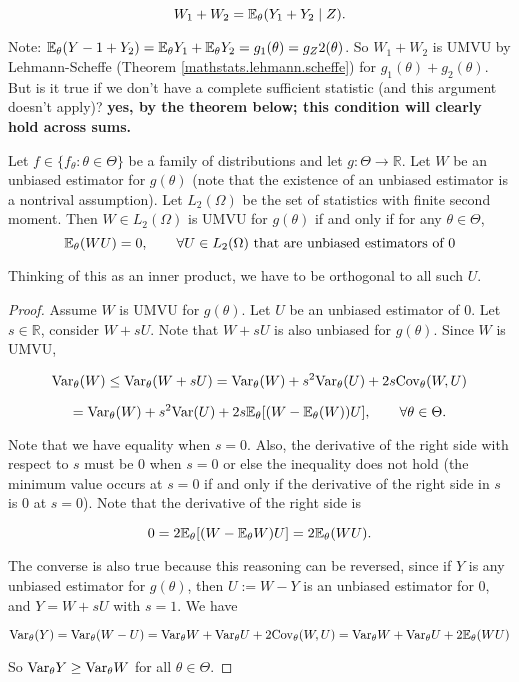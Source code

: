\[
W_1 + W_2 = \E_\theta(Y_1 + Y_2 \mid Z).
\]

Note: \(\E_\theta(Y-1 + Y_2) = \E_\theta Y_1 + \E_\theta Y_2 = g_1(\theta) = g_Z2(\theta)\). So \(W_1 + W_2\) is UMVU by Lehmann-Scheffe (Theorem \ref{mathstats.lehmann.scheffe}) for \(g_1(\theta) + g_2(\theta)\). But is it true if we don't have a complete sufficient statistic (and this argument doesn't apply)? \textbf{yes, by the theorem below; this condition will clearly hold across sums.}

\begin{theorem} Let \(f \in \{f_\theta: \theta \in \Theta \}\) be a family of distributions and let \(g:\Theta \to \mathbb{R}\). Let \(W\) be an unbiased estimator for \(g(\theta)\) (note that the existence of an unbiased estimator is a nontrival assumption). Let \(L_2(\Omega)\) be the set of statistics with finite second moment. Then \(W \in L_2(\Omega)\) is UMVU for \(g(\theta)\) if and only if for any \(\theta \in \Theta\), 
\[
\E_\theta( WU) = 0 , \qquad \forall U \in L_2(\Omega) \text{ that are unbiased estimators of } 0
\]

Thinking of this as an inner product, we have to be orthogonal to all such \(U\).

\end{theorem}

\begin{proof} Assume \(W\) is UMVU for \(g(\theta)\). Let \(U\) be an unbiased estimator of \(0\). Let \(s \in \mathbb{R}\), consider \(W + sU\). Note that \(W + sU\) is also unbiased for \(g(\theta)\). Since \(W\) is UMVU,

\[
\Var_\theta (W) \leq \Var_\theta(W + sU) = \Var_\theta(W) + s^2 \Var_\theta(U) + 2s \Cov_\theta(W, U)
\]

\[
= \Var_\theta(W) + s^2 \Var(U) + 2s \E_\theta[(W- \E_\theta(W) )U ] , \qquad \forall \theta \in \Theta.
\]

Note that we have equality when \(s = 0\). Also, the derivative of the right side with respect to \(s\) must be 0 when \(s=0\) or else the inequality does not hold (the minimum value occurs at \(s=0\) if and only if the derivative of the right side in \(s\) is 0 at \(s=0\)). Note that the derivative of the right side is

\[
0 = 2 \E_\theta [(W - \E_\theta W) U ] = 2 \E_\theta(WU).
\]

The converse is also true because this reasoning can be reversed, since if \(Y\) is any unbiased estimator for \(g(\theta)\), then \(U:= W - Y\) is an unbiased estimator for 0, and \(Y = W + sU\) with \(s=1\). We have

\[
\Var_\theta(Y) = \Var_\theta(W - U) = \Var_\theta W + \Var_\theta U + 2 \Cov_\theta(W, U)  = \Var_\theta W + \Var_\theta U + 2 \E_\theta(WU) 
\]

So \(\Var_\theta Y \geq \Var_\theta W\) for all \(\theta \in \Theta\).
%

\end{proof}


